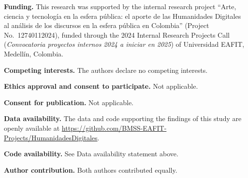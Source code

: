 \documentclass[pdflatex,sn-mathphys-num,iicol]{sn-jnl}
\begin{document}
	\textbf{Funding.} This research was supported by the internal research project ``Arte, ciencia y tecnolog{\'i}a en la esfera p{\'u}blica: el aporte de las Humanidades Digitales al an{\'a}lisis de los discursos en la esfera p{\'u}blica en Colombia'' (Project No.\ 12740112024), funded through the 2024 Internal Research Projects Call (\textit{Convocatoria proyectos internos 2024 a iniciar en 2025}) of Universidad EAFIT, Medell{\'i}n, Colombia.
	
	
	\textbf{Competing interests.} The authors declare no competing interests.
	
	\textbf{Ethics approval and consent to participate.} Not applicable.
	
	\textbf{Consent for publication.} Not applicable.
	
	\textbf{Data availability.} The data and code supporting the findings of this study are openly available at \url{https://github.com/BMSS-EAFIT-Projects/HumanidadesDigitales}.
	
	\textbf{Code availability.} See Data availability statement above.
	
	\textbf{Author contribution.} Both authors contributed equally.
	
	
	
\end{document}
